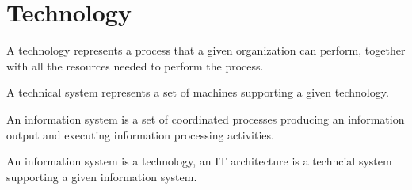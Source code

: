 \section{Technology}

\begin{definition}
    A technology represents a process that a given organization can perform, together with all the resources needed to perform the process. 
\end{definition}
\begin{definition}
    A technical system represents a set of machines supporting a given technology.
\end{definition}
\begin{definition}
    An information system is a set of coordinated processes producing an information output and executing information processing activities. 
\end{definition}
\begin{definition}
    An information system is a technology, an IT architecture is a techncial system supporting a given information system.
\end{definition}

